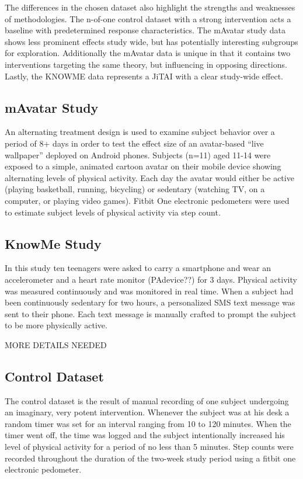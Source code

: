 \documentclass[review,journal]{vgtc}         %
\begin{document}
The differences in the chosen dataset also highlight the strengths and weaknesses of methodologies. 
The n-of-one control dataset with a strong intervention acts a baseline with predetermined response characteristics.
The mAvatar study data shows less prominent effects study wide, but has potentially interesting subgroups for exploration.
Additionally the mAvatar data is unique in that it contains two interventions targeting the same theory, but influencing in opposing directions.
Lastly, the KNOWME data represents a JiTAI with a clear study-wide effect.


\subsection{mAvatar Study}
An alternating treatment design is used to examine subject behavior over a period of 8+ days in order to test the effect size of an avatar-based “live wallpaper” deployed on Android phones.
Subjects (n=11) aged 11-14 were exposed to a simple, animated cartoon avatar on their mobile device showing alternating levels of physical activity.
Each day the avatar would either be active (playing basketball, running, bicycling) or sedentary (watching TV, on a computer, or playing video games).
Fitbit One electronic pedometers were used to estimate subject levels of physical activity via step count.

\subsection{KnowMe Study}
In this study ten teenagers were asked to carry a smartphone and wear an accelerometer and a heart rate monitor (PAdevice??) for 3 days.
Physical activity was measured continuously and was monitored in real time.
When a subject had been continuously sedentary for two hours, a personalized SMS text message was sent to their phone.
Each text message is manually crafted to prompt the subject to be more physically active.

MORE DETAILS NEEDED

\subsection{Control Dataset}
The control dataset is the result of manual recording of one subject undergoing an imaginary, very potent intervention.
Whenever the subject was at his desk a random timer was set for an interval ranging from 10 to 120 minutes.
When the timer went off, the time was logged and the subject intentionally increased his level of physical activity for a period of no less than 5 minutes.
Step counts were recorded throughout the duration of the two-week study period using a fitbit one electronic pedometer.
\end{document}
